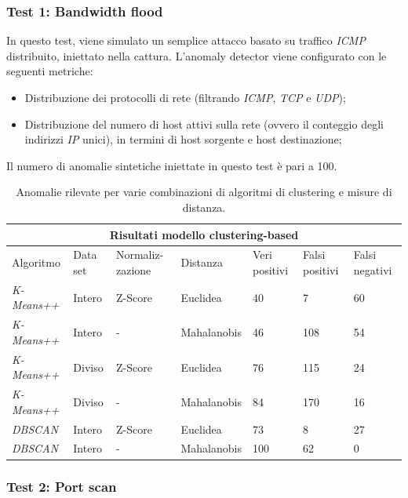 \documentclass[12pt,a4paper,cucitura]{toptesi}
\begin{document}
\subsubsection{Test 1: Bandwidth flood}

In questo test, viene simulato un semplice attacco basato su traffico \emph{ICMP} distribuito, iniettato nella cattura.
L'anomaly detector viene configurato con le seguenti metriche:

\begin{itemize}
\item Distribuzione dei protocolli di rete (filtrando \emph{ICMP}, \emph{TCP} e \emph{UDP});
\item Distribuzione del numero di host attivi sulla rete (ovvero il conteggio degli indirizzi \emph{IP} unici), in termini di host sorgente e host destinazione;
\end{itemize}

Il numero di anomalie sintetiche iniettate in questo test è pari a 100.

\begin{center}
\begin{table}
\begin{tabular}{l|l|p{1.7cm}|l|p{1.5cm}|p{1.5cm}|p{1.5cm}}
\hline
\hline
\multicolumn{7}{c}{Risultati modello clustering-based} \\
\hline
Algoritmo & Data set & Normaliz- zazione & Distanza & Veri positivi & Falsi positivi & Falsi negativi \\
\hline
\emph{K-Means++} & Intero & Z-Score & Euclidea & 40 & 7 & 60 \\
\emph{K-Means++} & Intero & - & Mahalanobis & 46 & 108 & 54 \\
\emph{K-Means++} & Diviso & Z-Score & Euclidea & 76 & 115 & 24 \\
\emph{K-Means++} & Diviso & - & Mahalanobis & 84 & 170 & 16 \\
\emph{DBSCAN} & Intero & Z-Score & Euclidea & 73 & 8 & 27 \\
\emph{DBSCAN} & Intero & - & Mahalanobis & 100 & 62 & 0 \\
\hline
\hline
\end{tabular}
\caption[Bandwidth flood - anomalie rilevate]{Anomalie rilevate per varie combinazioni di algoritmi di clustering e misure di distanza.}
\end{table}
\end{center}

\subsubsection{Test 2: Port scan}
\end{document}
